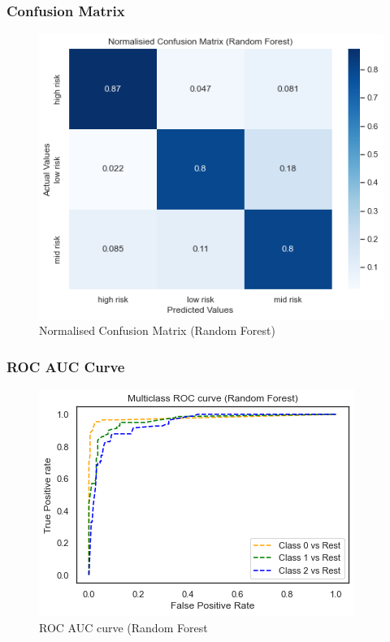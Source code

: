 \documentclass[12pt, letter]{article}
\begin{document}
\pagebreak
\subsubsection{Confusion Matrix}
\begin{figure}[h]
    \centering
    \includegraphics[scale = 0.5]{RF_CM.png}
    \caption{Normalised Confusion Matrix (Random Forest)}
    \label{RF_CM}
\end{figure}

\subsubsection{ROC AUC Curve}
\begin{figure}[h]
    \centering
    \includegraphics[scale = 0.8]{ROC_RF.png}
    \caption{ROC AUC curve (Random Forest}
    \label{ROC_DT}
\end{figure}
\end{document}
